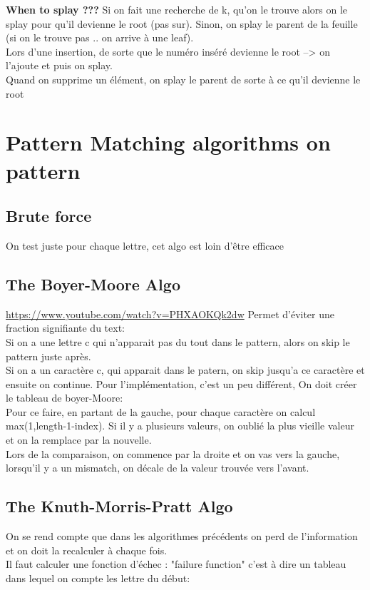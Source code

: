 \documentclass[a4paper]{article}
\begin{document}
\textbf{When to splay ???}
Si on fait une recherche de k, qu'on le trouve alors on le splay pour qu'il devienne le root (pas sur). Sinon, on splay le parent de la feuille (si on le trouve pas .. on arrive à une leaf).\\
Lors d'une insertion, de sorte que le numéro inséré devienne le root --> on l'ajoute et puis on splay.\\
Quand on supprime un élément, on splay le parent de sorte à ce qu'il devienne le root

\section{Pattern Matching algorithms on pattern}

\subsection{Brute force}
On test juste pour chaque lettre, cet algo est loin d'être efficace

\subsection{The Boyer-Moore Algo}
\url{https://www.youtube.com/watch?v=PHXAOKQk2dw}
Permet d'éviter une fraction signifiante du text:\\
Si on a une lettre c qui n'apparait pas du tout dans le pattern, alors on skip le pattern juste après.\\
Si on a un caractère c, qui apparait dans le patern, on skip jusqu'a ce caractère et ensuite on continue.
Pour l'implémentation, c'est un peu différent, On doit créer le tableau de boyer-Moore:\\
Pour ce faire, en partant de la gauche, pour chaque caractère on calcul max(1,length-1-index).
Si il y a plusieurs valeurs, on oublié la plus vieille valeur et on la remplace par la nouvelle.\\
Lors de la comparaison, on commence par la droite et on vas vers la gauche, lorsqu'il y a un mismatch, on décale de la valeur trouvée vers l'avant.

\subsection{The Knuth-Morris-Pratt Algo}
On se rend compte que dans les algorithmes précédents on perd de l'information et on doit la recalculer à chaque fois.\\
Il faut calculer une fonction d'échec : "failure function"
c'est à dire un tableau dans lequel on compte les lettre du début:
\end{document}

